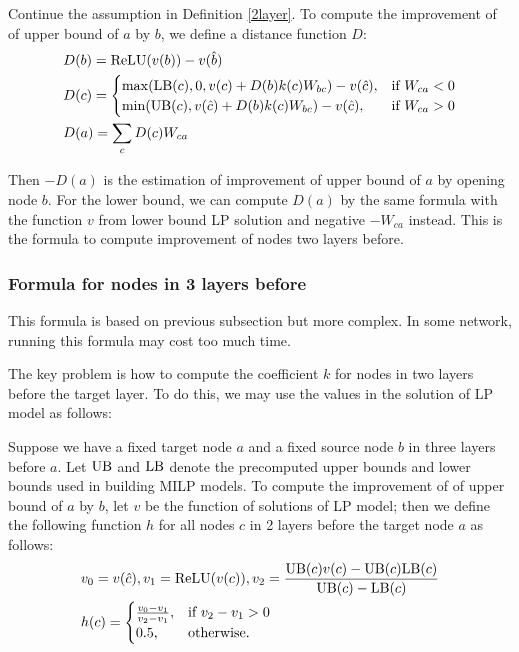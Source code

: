 \begin{definition}
	Continue the assumption in Definition \ref{2layer}. To compute the improvement of of upper bound of $a$ by $b$, we define a distance function $D$:
	\begin{align}
		&D(b) = \mathrm{ReLU}(v(b))-v(\hat{b})\\
			&D(c) =
		\begin{cases}
			\max(\mathrm{LB}(c), 0, v(c)+D(b)k(c)W_{bc})-v(\hat{c}), & \text{if }W_{ca} < 0\\
			\min(\mathrm{UB}(c), v(\hat{c})+D(b)k(c)W_{bc})-v(\hat{c}), & \text{if }  W_{ca} > 0
		\end{cases}\\
		&D(a) = \sum_c D(c)W_{ca}
	\end{align}
\end{definition}

Then $-D(a)$ is the estimation of improvement of upper bound of $a$ by opening node $b$. For the lower bound, we can compute $D(a)$ by the same formula with the function $v$ from lower bound LP solution and negative $-W_{ca}$ instead. This is the formula to compute improvement of nodes two layers before.


\subsubsection*{Formula for nodes in 3 layers before} 

This formula is based on previous subsection but more complex. In some network, running this formula may cost too much time. 

The key problem is how to compute the coefficient $k$ for nodes in two layers before the target layer. To do this, we may use the values in the solution of LP model as follows:

\begin{definition}\label{3layer}
	Suppose we have a fixed target node $a$ and a fixed source node $b$ in three layers before $a$. Let $\mathrm{UB}$ and $\mathrm{LB}$ denote the precomputed upper bounds and lower bounds used in building MILP models. To compute the improvement of of upper bound of $a$ by $b$, let $v$ be the function of solutions of LP model; then we define the following function $h$ for all nodes $c$ in 2 layers before the target node $a$ as follows:
	\begin{align}
		&v_0 = v(\hat{c}), v_1 = \mathrm{ReLU}(v(c)), v_2 = \frac{\mathrm{UB}(c)v(c)-\mathrm{UB}(c)\mathrm{LB}(c)}{\mathrm{UB}(c)-\mathrm{LB}(c)}\\
		&h(c) =
		\begin{cases}
			\frac{v_0-v_1}{v_2-v_1}, & \text{if } v_2-v_1 > 0\\
			0.5, & \text{otherwise.}
		\end{cases}
	\end{align} 
\end{definition} 

